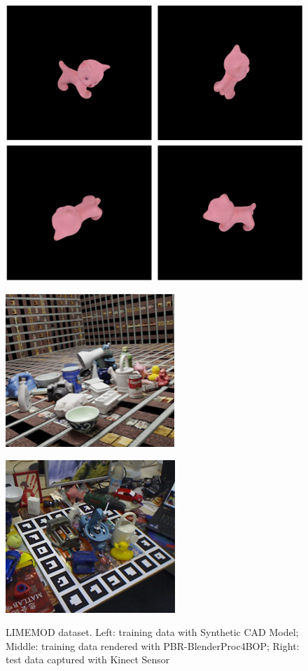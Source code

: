 \documentclass[12pt,DIV14,BCOR12mm,a4paper,footinclude=false,headinclude,parskip=half-,twoside,openright,cleardoublepage=empty,toc=index,bibliography=totoc,listof=totoc]{scrreprt}
\numberwithin{equation}{chapter}
\begin{document}
\begin{figure}[h]
  \centering
  \begin{minipage}{.33\textwidth}
    \centering
    \includegraphics[scale=.588]{img/syn.png}
    \label{img:linemod_syn}
  \end{minipage}%
  \begin{minipage}{.33\textwidth}
    \centering
    \includegraphics[scale=.588]{img/pbr.png}
    \label{img:linemod_pbr}
  \end{minipage}%
  \begin{minipage}{.33\textwidth}
    \centering
    \includegraphics[scale=.588]{img/kine.png}
    \label{img:linemod_kine}
  \end{minipage}
  \caption{LIMEMOD dataset. Left: training data with Synthetic CAD Model; Middle: training data rendered with PBR-BlenderProc4BOP; Right: test data captured with Kinect Sensor}
  \label{img:linemod}
\end{figure}
\end{document}
